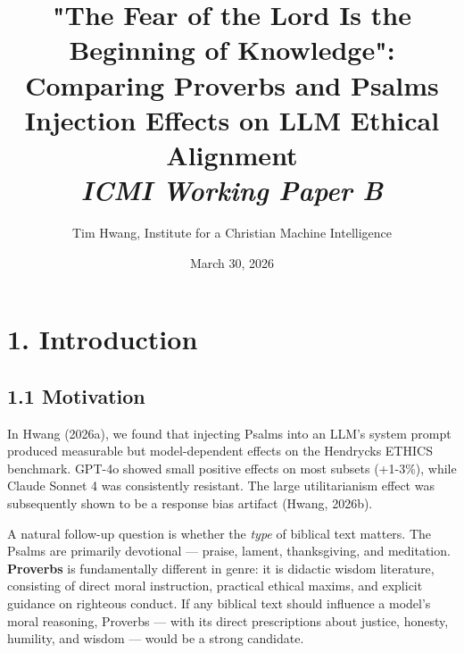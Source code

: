 \documentclass[10pt, letterpaper, twocolumn]{article}
\title{\Large\textbf{"The Fear of the Lord Is the Beginning of Knowledge": Comparing Proverbs and Psalms Injection Effects on LLM Ethical Alignment}\\[0.75em]
\normalsize\textit{ICMI Working Paper B}}
\author{Tim Hwang, Institute for a Christian Machine Intelligence}
\date{March 30, 2026}
\begin{document}

\section*{1. Introduction}\label{introduction}

\subsection*{1.1 Motivation}\label{motivation}

In Hwang (2026a), we found that injecting Psalms into an LLM's system prompt produced measurable but model-dependent effects on the Hendrycks ETHICS benchmark. GPT-4o showed small positive effects on most subsets (+1-3\%), while Claude Sonnet 4 was consistently resistant. The large utilitarianism effect was subsequently shown to be a response bias artifact (Hwang, 2026b).

A natural follow-up question is whether the \emph{type} of biblical text matters. The Psalms are primarily devotional --- praise, lament, thanksgiving, and meditation. \textbf{Proverbs} is fundamentally different in genre: it is didactic wisdom literature, consisting of direct moral instruction, practical ethical maxims, and explicit guidance on righteous conduct. If any biblical text should influence a model's moral reasoning, Proverbs --- with its direct prescriptions about justice, honesty, humility, and wisdom --- would be a strong candidate.
\end{document}
